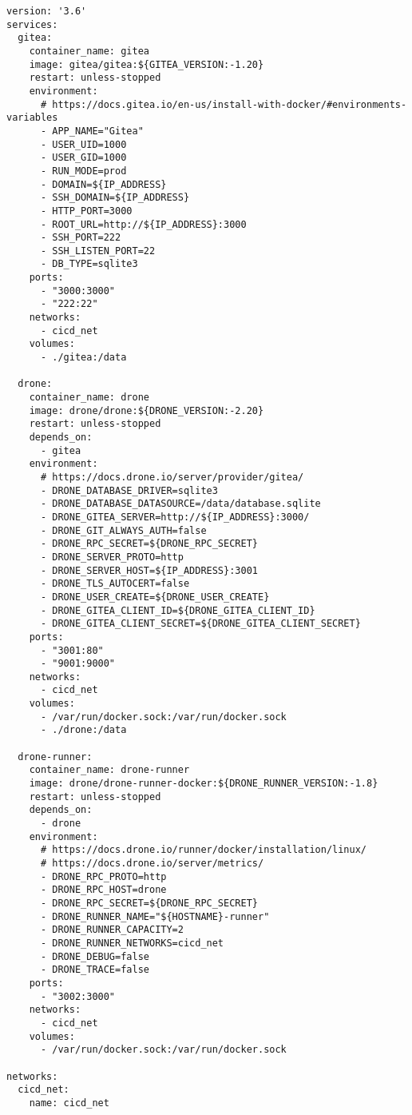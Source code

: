 \begin{lstlisting}[style=yaml, caption={docker-compose.yml Gitea-Drone CI prueba de concepto.}, label={lst:ci_gitea_drone} ]
version: '3.6'
services:
  gitea:
    container_name: gitea
    image: gitea/gitea:${GITEA_VERSION:-1.20}
    restart: unless-stopped
    environment:
      # https://docs.gitea.io/en-us/install-with-docker/#environments-variables
      - APP_NAME="Gitea"
      - USER_UID=1000
      - USER_GID=1000
      - RUN_MODE=prod
      - DOMAIN=${IP_ADDRESS}
      - SSH_DOMAIN=${IP_ADDRESS}
      - HTTP_PORT=3000
      - ROOT_URL=http://${IP_ADDRESS}:3000
      - SSH_PORT=222
      - SSH_LISTEN_PORT=22
      - DB_TYPE=sqlite3
    ports:
      - "3000:3000"
      - "222:22"
    networks:
      - cicd_net
    volumes:
      - ./gitea:/data

  drone:
    container_name: drone
    image: drone/drone:${DRONE_VERSION:-2.20}
    restart: unless-stopped
    depends_on:
      - gitea
    environment:
      # https://docs.drone.io/server/provider/gitea/
      - DRONE_DATABASE_DRIVER=sqlite3
      - DRONE_DATABASE_DATASOURCE=/data/database.sqlite
      - DRONE_GITEA_SERVER=http://${IP_ADDRESS}:3000/
      - DRONE_GIT_ALWAYS_AUTH=false
      - DRONE_RPC_SECRET=${DRONE_RPC_SECRET}
      - DRONE_SERVER_PROTO=http
      - DRONE_SERVER_HOST=${IP_ADDRESS}:3001
      - DRONE_TLS_AUTOCERT=false
      - DRONE_USER_CREATE=${DRONE_USER_CREATE}
      - DRONE_GITEA_CLIENT_ID=${DRONE_GITEA_CLIENT_ID}
      - DRONE_GITEA_CLIENT_SECRET=${DRONE_GITEA_CLIENT_SECRET}
    ports:
      - "3001:80"
      - "9001:9000"
    networks:
      - cicd_net
    volumes:
      - /var/run/docker.sock:/var/run/docker.sock
      - ./drone:/data

  drone-runner:
    container_name: drone-runner
    image: drone/drone-runner-docker:${DRONE_RUNNER_VERSION:-1.8}
    restart: unless-stopped
    depends_on:
      - drone
    environment:
      # https://docs.drone.io/runner/docker/installation/linux/
      # https://docs.drone.io/server/metrics/
      - DRONE_RPC_PROTO=http
      - DRONE_RPC_HOST=drone
      - DRONE_RPC_SECRET=${DRONE_RPC_SECRET}
      - DRONE_RUNNER_NAME="${HOSTNAME}-runner"
      - DRONE_RUNNER_CAPACITY=2
      - DRONE_RUNNER_NETWORKS=cicd_net
      - DRONE_DEBUG=false
      - DRONE_TRACE=false
    ports:
      - "3002:3000"
    networks:
      - cicd_net
    volumes:
      - /var/run/docker.sock:/var/run/docker.sock

networks:
  cicd_net:
    name: cicd_net

\end{lstlisting}

